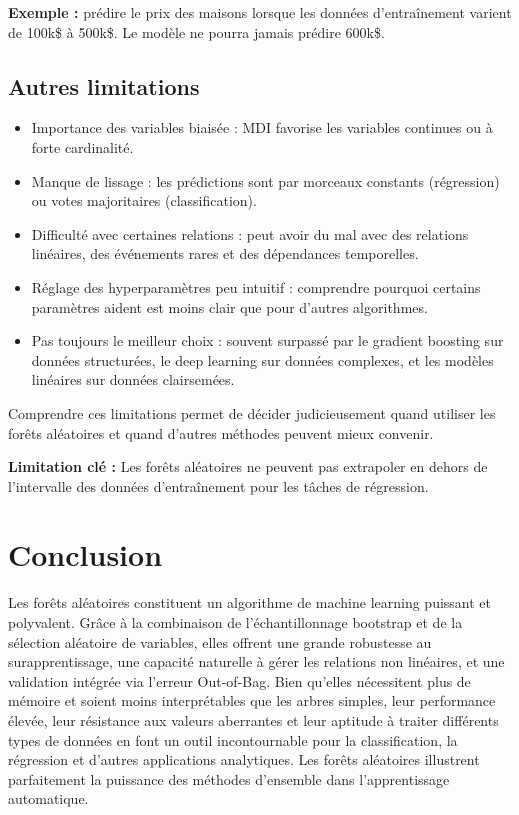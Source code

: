 \textbf{Exemple :} prédire le prix des maisons lorsque les données d’entraînement varient de 100k\$ à 500k\$. Le modèle ne pourra jamais prédire 600k\$.

\subsection{Autres limitations}

\begin{itemize}
    \item Importance des variables biaisée : MDI favorise les variables continues ou à forte cardinalité.
    \item Manque de lissage : les prédictions sont par morceaux constants (régression) ou votes majoritaires (classification).
    \item Difficulté avec certaines relations : peut avoir du mal avec des relations linéaires, des événements rares et des dépendances temporelles.
    \item Réglage des hyperparamètres peu intuitif : comprendre pourquoi certains paramètres aident est moins clair que pour d’autres algorithmes.
    \item Pas toujours le meilleur choix : souvent surpassé par le gradient boosting sur données structurées, le deep learning sur données complexes, et les modèles linéaires sur données clairsemées.
\end{itemize}

Comprendre ces limitations permet de décider judicieusement quand utiliser les forêts aléatoires et quand d’autres méthodes peuvent mieux convenir.

\medskip
\noindent
\textbf{Limitation clé :} Les forêts aléatoires ne peuvent pas extrapoler en dehors de l’intervalle des données d’entraînement pour les tâches de régression.

\section*{Conclusion}
Les forêts aléatoires constituent un algorithme de machine learning puissant et polyvalent. Grâce à la combinaison de l'échantillonnage bootstrap et de la sélection aléatoire de variables, elles offrent une grande robustesse au surapprentissage, une capacité naturelle à gérer les relations non linéaires, et une validation intégrée via l'erreur Out-of-Bag. Bien qu'elles nécessitent plus de mémoire et soient moins interprétables que les arbres simples, leur performance élevée, leur résistance aux valeurs aberrantes et leur aptitude à traiter différents types de données en font un outil incontournable pour la classification, la régression et d'autres applications analytiques. Les forêts aléatoires illustrent parfaitement la puissance des méthodes d'ensemble dans l'apprentissage automatique.

